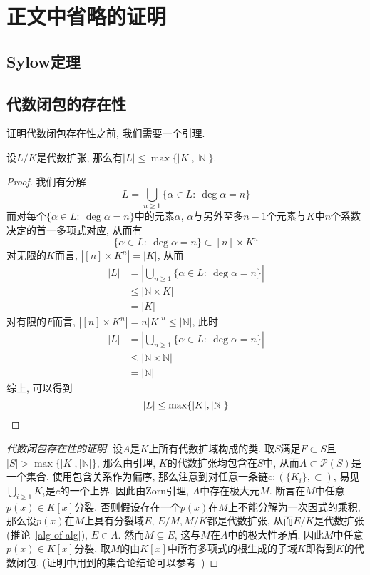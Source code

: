 \chapter{正文中省略的证明}

\section{Sylow定理}\label{proof of sylow}

\section{代数闭包的存在性}\label{proof of alg closure}

证明代数闭包存在性之前, 我们需要一个引理.
\begin{lem}
    设$L/K$是代数扩张, 那么有$|L|\leq\max\{|K|,|\mathbb{N}|\}$.
\end{lem}
\begin{proof}
    我们有分解
    \[L=\bigcup_{n\geq 1}\{\alpha\in L:\ \deg\alpha=n\}\]
    而对每个$\{\alpha\in L:\ \deg\alpha=n\}$中的元素$\alpha$, $\alpha$与另外至多$n-1$个元素与$K$中$n$个系数决定的首一多项式对应, 从而有
    \[\{\alpha\in L:\ \deg\alpha=n\}\subset [n]\times K^n\]
    对无限的$K$而言, $|[n]\times K^n|=|K|$, 从而
    \begin{align*}
        |L|&=\left|\bigcup_{n\geq 1}\{\alpha\in L:\ \deg\alpha=n\}\right|\\
        &\leq|\mathbb{N}\times K|\\
        &=|K|
    \end{align*}
    对有限的$F$而言, $|[n]\times K^n|=n|K|^n\leq|\mathbb{N}|$, 此时
    \begin{align*}
        |L|&=\left|\bigcup_{n\geq 1}\{\alpha\in L:\ \deg\alpha=n\}\right|\\
        &\leq|\mathbb{N}\times\mathbb{N}|\\
        &=|\mathbb{N}|
    \end{align*}
    综上, 可以得到
    \[|L|\leq\max\{|K|,|\mathbb{N}|\}\qedhere\]
\end{proof}

\begin{proof}[代数闭包存在性的证明]
    设$A$是$K$上所有代数扩域构成的类.
    取$S$满足$F\subset S$且$|S|>\max\{|K|,|\mathbb{N}|\}$, 那么由引理, $K$的代数扩张均包含在$S$中, 从而$A\subset\mathcal{P}(S)$是一个集合.
    使用包含关系作为偏序, 那么注意到对任意一条链$c:(\{K_i\},\subset)$, 易见$\bigcup_{i\geq 1}K_i$是$c$的一个上界.
    因此由Zorn引理, $A$中存在极大元$M$.
    断言在$M$中任意$p(x)\in K[x]$分裂.
    否则假设存在一个$p(x)$在$M$上不能分解为一次因式的乘积, 那么设$p(x)$在$M$上具有分裂域$E$, $E/M,M/K$都是代数扩张, 从而$E/K$是代数扩张 (推论~\ref{alg of alg}), $E\in A$.
    然而$M\subsetneq E$, 这与$M$在$A$中的极大性矛盾.
    因此$M$中任意$p(x)\in K[x]$分裂, 取$M$的由$K[x]$中所有多项式的根生成的子域$\overline{K}$即得到$K$的代数闭包.
    (证明中用到的集合论结论可以参考~\parencite[附录2第2, 3节]{Lang})
\end{proof}

